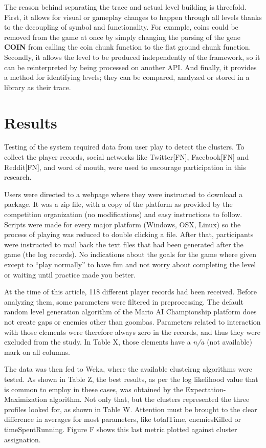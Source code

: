 \documentclass[conference]{IEEEtran}
\begin{document}
The reason behind separating the trace and actual level building is threefold. First, it allows for visual or gameplay changes to happen through all levels thanks to the decoupling of symbol and functionality. For example, coins could be removed from the game at once by simply changing the parsing of the gene \textbf{COIN} from calling the coin chunk function to the flat ground chunk function. Secondly, it allows the level to be produced independently of the framework, so it can be reinterpreted by being processed on another API. And finally, it provides a method for identifying levels; they can be compared, analyzed or stored in a library as their trace.


\section{Results}

Testing of the system required data from user play to detect the clusters. To collect the player records, social networks like Twitter[FN], Facebook[FN] and Reddit[FN], and word of mouth, were used to encourage participation in this research.

Users were directed to a webpage where they were instructed to download a package. It was a zip file, with a copy of the platform as provided by the competition organization (no modifications) and easy instructions to follow. Scripts were made for every major platform (Windows, OSX, Linux) so the process of playing was reduced to double clicking a file. After that, participants were instructed to mail back the text files that had been generated after the game (the log records). No indications about the goals for the game where given except to ``play normally'' to have fun and not worry about completing the level or waiting until practice made you better.

At the time of this article, 118 different player records had been received. Before analyzing them, some parameters were filtered in preprocessing. The default random level generation algorithm of the Mario AI Championship platform does not create gaps or enemies other than goombas. Parameters related to interaction with those elements were therefore always zero in the records, and thus they were excluded from the study. In Table X, those elements have a \textit{n/a} (not available) mark on all columns.

The data was then fed to Weka, where the available clusteirng algorithms were tested. As shown in Table Z, the best results, as per the log likelihood value that is common to employ in these cases, was obtained by the Expectation-Maximization algorithm. Not only that, but the clusters represented the three profiles looked for, as shown in Table W. Attention must be brought to the clear difference in averages for most parameters, like totalTime, enemiesKilled or timeSpentRunning. Figure F shows this last metric plotted against cluster assignation.
\end{document}
